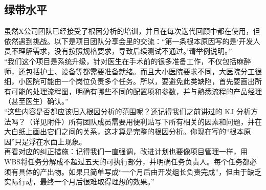 
\hypertarget{ux7effux5e26ux6c34ux5e73}{%
\subsection{绿带水平}\label{ux7effux5e26ux6c34ux5e73}}

虽然X公司团队已经接受了根因分析的培训，并且在每次迭代回顾中都在使用，但依然遇到挑战。以下是项目团队分享会里的交流：``第一条根本原因写的是`开发人员不理解需求，没有按照规格要求，导致后续测试不通过。'请举例说明。''\\
``我们这个项目是系统升级，针对医生在手术前的很多准备工作，不仅包括麻醉师，还包括护士、设备等都需要准备就绪。而且大小医院要求不同，大医院分工很细，小医院可能由一个岗位负责多个任务。所以，要避免此类缺陷，首先要画出所有可能的处理流程图，明确有哪些不同的配置项和参数，并与熟悉流程的产品经理（甚至医生）确认。''\\
``这些内容是否都应该归入根因分析的范围呢？还记得我们之前讲过的 KJ
分析方法吗？（详见附件）所有团队成员需要用便利贴写下所有相关的因素和问题，并在大白纸上画出它们之间的关系，这才算是完整的根因分析。你现在写的``根本原因''只是浮在水面上现象。\\
再看对应的纠正措施：记得我们一直强调，改进计划也要像项目管理一样，用WBS将任务分解成不超过五天的可执行部分，并明确任务负责人。每个任务都必须有具体的产出物。如果只简单写成``一个月后由开发组长负责完成''，但由于缺乏实际行动，最终一个月后很难取得理想的效果。''



